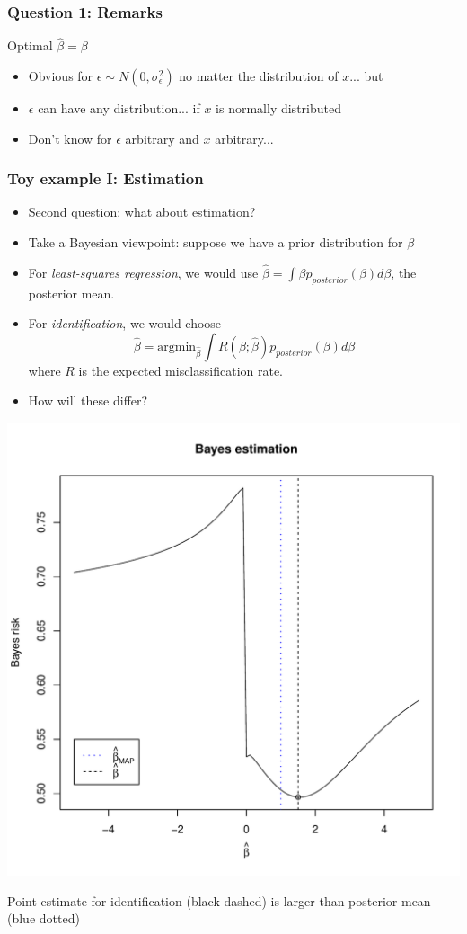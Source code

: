 \documentclass{beamer}
\newcommand{\argmin}{\text{argmin}}
\begin{document}
\begin{frame}
\frametitle{Question 1: Remarks}
Optimal $\hat{\beta} = \beta$
\begin{itemize}
\item Obvious for $\epsilon \sim N(0, \sigma^2_\epsilon)$ no matter the distribution of $x$... but
\item $\epsilon$ can have any distribution... if $x$ is normally distributed
\item Don't know for $\epsilon$ arbitrary and $x$ arbitrary...
\end{itemize}
\end{frame}

\begin{frame}
\frametitle{Toy example I: Estimation}
\begin{itemize}
\item Second question: what about estimation?
\item Take a Bayesian viewpoint: suppose we have a prior distribution for $\beta$
\item For \emph{least-squares regression}, we would use $\hat{\beta} = \int \beta p_{posterior}(\beta) d\beta$, the posterior mean.
\item For \emph{identification}, we would choose
\[
\hat{\beta} = \argmin_{\hat{\beta}} \int R(\beta; \hat{\beta}) p_{posterior}(\beta) d\beta
\]
where $R$ is the expected misclassification rate.
\item How will these differ?
\end{itemize}
\end{frame}

\begin{frame}
\begin{center}
\includegraphics[scale = .4]{toy_est.pdf}
\end{center}
Point estimate for identification (black dashed) is larger than posterior mean (blue dotted)
\end{frame}
\end{document}
